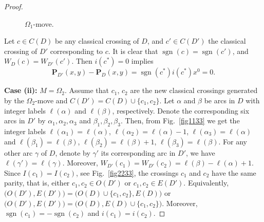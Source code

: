\documentclass[12pt]{amsart}
\theoremstyle{noparens}
\numberwithin{equation}{section}
\numberwithin{equation}{section}
\begin{document}
\begin{proof}
\begin{figure}[!ht]
\begin{center}
			\caption{$\Omega_1$-move.} \label{fig1122}
		\end{center}
	\end{figure}
	
	Let $c\in C(D)$ be any classical crossing of $D$, and $c'\in C(D')$ the classical crossing of $D'$ corresponding to $c$. It is clear that $\operatorname{sgn}(c)=\operatorname{sgn}(c')$, and $W_D(c)=W_{D'}(c')$. Then $i(c^*)=0$ implies 
	$$
	\mathbf{P}_{D'}(x,y) - \mathbf{P}_D(x,y) = \operatorname{sgn}(c^*)i(c^*)x^0 =0.
	$$
	
	\noindent
	\textbf{Case (ii):} $M =\Omega_2$. Assume that $c_1$, $c_2$ are the new classical crossings generated by the $\Omega_2$-move and $C(D')=C(D)\cup \{c_1,c_2\}$. Let $\alpha$ and $\beta$ be arcs in $D$ with  integer labels $\ell(\alpha)$ and $\ell(\beta)$, respectively.  Denote the corresponding six arcs in $D'$ by $\alpha_1, \alpha_2, \alpha_3$ and $\beta_1, \beta_2, \beta_3$.  Then, from Fig.~\ref{fig1133} we get the integer labels $\ell(\alpha_1) = \ell(\alpha)$, $\ell(\alpha_2) = \ell(\alpha) - 1$, $\ell(\alpha_3) = \ell(\alpha)$ and $\ell(\beta_1) = \ell(\beta)$, $\ell(\beta_2) = \ell(\beta) + 1$, $\ell(\beta_3) = \ell(\beta)$. 
	For any other arc $\gamma$ of $D$, denote by $\gamma'$ its corresponding arc in $D'$, we have $\ell(\gamma') = \ell(\gamma)$. Moreover, $W_{D'}(c_1)=W_{D'}(c_2)=\ell(\beta)-\ell(\alpha)+1$. Since $I(c_1)=I(c_2)$, see Fig.~\ref{fig2233}, the crossings $c_1$ and $c_2$ have the same parity, that is, either $c_1, c_2 \in O(D')$ or $c_1, c_2 \in E(D')$. Equivalently, $\bigl(O(D'), E(D')\bigr) = \bigl(O(D) \cup \{c_1, c_2\}, E(D)\bigr)$ or $\bigl(O(D'), E(D')\bigr) = \bigl(O(D), E(D) \cup \{c_1, c_2\}\bigr)$. Moreover, $\operatorname{sgn}(c_1)=- \operatorname{sgn}(c_2)$ and $i(c_1)=i(c_2)$.
	

\end{proof}
\end{document}
